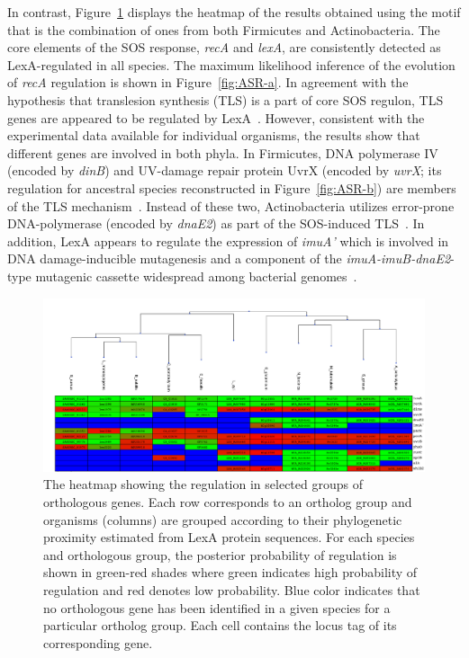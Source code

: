 \documentclass[12pt]{article}
\begin{document}
In contrast, Figure~\ref{fig:heatmap_2} displays the heatmap of the results
obtained using the motif that is the combination of ones from both Firmicutes
and Actinobacteria.  The core elements of the SOS response, \textit{recA} and
\textit{lexA}, are consistently detected as LexA-regulated in all species. The
maximum likelihood inference of the evolution of \textit{recA} regulation is
shown in Figure~\ref{fig:ASR-a}.  In agreement with the hypothesis that
translesion synthesis (TLS) is a part of core SOS regulon, TLS genes are
appeared to be regulated by LexA~\cite{erill2007aeons, galhardo2009dinb,
  boshoff2003dnae2}. However, consistent with the experimental data available
for individual organisms, the results show that different genes are involved in
both phyla. In Firmicutes, DNA polymerase IV (encoded by \textit{dinB}) and
UV-damage repair protein UvrX (encoded by \textit{uvrX}; its regulation for
ancestral species reconstructed in Figure~\ref{fig:ASR-b}) are members of the
TLS mechanism~\cite{au2005genetic, van2010sos, cirz2007complete}. Instead of
these two, Actinobacteria utilizes error-prone DNA-polymerase (encoded by
\textit{dnaE2}) as part of the SOS-induced TLS~\cite{jochmann2009genetic,
  davis2002definition, boshoff2003dnae2}. In addition, LexA appears to regulate
the expression of \textit{imuA'} which is involved in DNA damage-inducible
mutagenesis and a component of the \textit{imuA-imuB-dnaE2}-type mutagenic
cassette widespread among bacterial genomes~\cite{erill2006dispersal}.

\begin{figure}
  \centering
  \includegraphics[width=\textwidth]{figures/chapter4/heatmap}
  \caption{The heatmap showing the regulation in selected groups of orthologous
    genes. Each row corresponds to an ortholog group and organisms (columns)
    are grouped according to their phylogenetic proximity estimated from LexA
    protein sequences. For each species and orthologous group, the posterior
    probability of regulation is shown in green-red shades where green
    indicates high probability of regulation and red denotes low
    probability. Blue color indicates that no orthologous gene has been
    identified in a given species for a particular ortholog group. Each cell
    contains the locus tag of its corresponding gene.}
  \label{fig:heatmap_2}
\end{figure}
\end{document}
